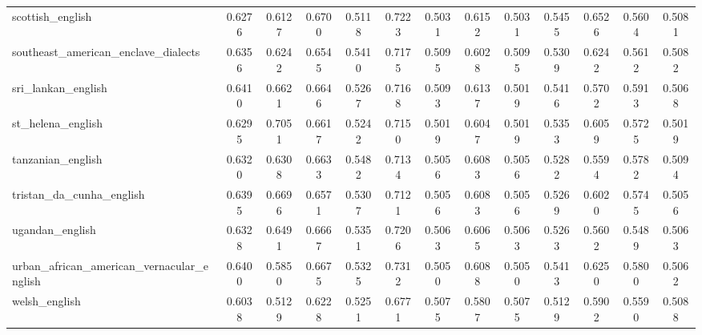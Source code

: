 \begin{landscape}
\begin{longtable}{lcccccccccccc}
scottish\_english & 0.6276 & 0.6127 & 0.6700 & 0.5118 & 0.7223 & 0.5031 & 0.6152 & 0.5031 & 0.5455 & 0.6526 & 0.5604 & 0.5081 \\
southeast\_american\_enclave\_dialects & 0.6356 & 0.6242 & 0.6545 & 0.5410 & 0.7175 & 0.5095 & 0.6028 & 0.5095 & 0.5309 & 0.6242 & 0.5612 & 0.5082 \\
sri\_lankan\_english & 0.6410 & 0.6621 & 0.6646 & 0.5267 & 0.7168 & 0.5093 & 0.6137 & 0.5019 & 0.5416 & 0.5702 & 0.5913 & 0.5068 \\
st\_helena\_english & 0.6295 & 0.7051 & 0.6617 & 0.5242 & 0.7150 & 0.5019 & 0.6047 & 0.5019 & 0.5353 & 0.6059 & 0.5725 & 0.5019 \\
tanzanian\_english & 0.6320 & 0.6308 & 0.6633 & 0.5482 & 0.7134 & 0.5056 & 0.6083 & 0.5056 & 0.5282 & 0.5594 & 0.5782 & 0.5094 \\
tristan\_da\_cunha\_english & 0.6395 & 0.6696 & 0.6571 & 0.5307 & 0.7121 & 0.5056 & 0.6083 & 0.5056 & 0.5269 & 0.6020 & 0.5745 & 0.5056 \\
ugandan\_english & 0.6328 & 0.6491 & 0.6667 & 0.5351 & 0.7206 & 0.5063 & 0.6065 & 0.5063 & 0.5263 & 0.5602 & 0.5489 & 0.5063 \\
urban\_african\_american\_vernacular\_english & 0.6400 & 0.5850 & 0.6675 & 0.5325 & 0.7312 & 0.5050 & 0.6088 & 0.5050 & 0.5413 & 0.6250 & 0.5800 & 0.5062 \\
welsh\_english & 0.6038 & 0.5129 & 0.6228 & 0.5251 & 0.6771 & 0.5075 & 0.5807 & 0.5075 & 0.5129 & 0.5902 & 0.5590 & 0.5088 \\
\bottomrule
\end{longtable}
\end{landscape}
